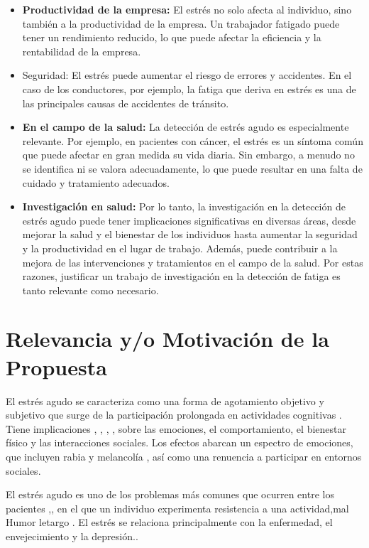 \begin{itemize}
    \item \textbf{Productividad de la empresa:} El estrés no solo afecta al individuo, sino también a la productividad de la empresa. Un trabajador fatigado puede tener un rendimiento reducido, lo que puede afectar la eficiencia y la rentabilidad de la empresa.
    \item Seguridad: El estrés  puede aumentar el riesgo de errores y accidentes. En el caso de los conductores, por ejemplo, la fatiga que deriva en estrés  es una de las principales causas de accidentes de tránsito.
    \item  \textbf{En el campo de la salud:} La detección de estrés agudo es especialmente relevante. Por ejemplo, en pacientes con cáncer, el estrés es un síntoma común que puede afectar en gran medida su vida diaria. Sin embargo, a menudo no se identifica ni se valora adecuadamente, lo que puede resultar en una falta de cuidado y tratamiento adecuados.
    \item \textbf{Investigación en salud:} Por lo tanto, la investigación en la detección de estrés agudo puede tener implicaciones significativas en diversas áreas, desde mejorar la salud y el bienestar de los individuos hasta aumentar la seguridad y la productividad en el lugar de trabajo. Además, puede contribuir a la mejora de las intervenciones y tratamientos en el campo de la salud. Por estas razones, justificar un trabajo de investigación en la detección de fatiga es tanto relevante como necesario.

\end{itemize}


\section{Relevancia y/o Motivación de la Propuesta}




El estrés agudo  se caracteriza como una forma de agotamiento objetivo y subjetivo que surge de la participación prolongada en actividades cognitivas \cite{ishii2014neural}. Tiene implicaciones \cite{grillon2015mental} , \cite{brown2019effects} , \cite{van2017effects} , \cite{dogan2023multi} , \cite{cropanzano2003relationship} sobre las emociones, el comportamiento, el bienestar físico y las interacciones sociales. Los efectos abarcan un espectro de emociones, que incluyen rabia y melancolía , así como una renuencia a participar en entornos sociales. 

El estrés agudo es uno de los problemas más comunes que ocurren entre los pacientes \cite{martin2018mental},\cite{marcora2009mental}, en el que un individuo experimenta resistencia a una actividad\cite{meijman2000theory},mal  Humor\cite{hockey1983stress}  letargo \cite{martin2018mental}. 
El estrés  se relaciona principalmente con la enfermedad, el envejecimiento
y la depresión.\cite{martin2018mental}.

